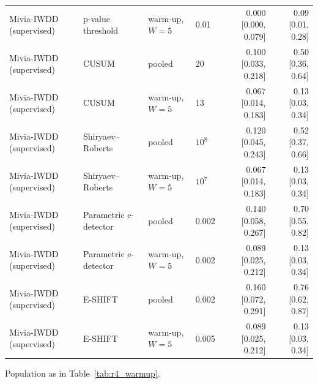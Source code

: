 \begin{table}[t]
{\begin{tabular}{llllrr}
Mivia-IWDD (supervised) & p-value threshold & warm-up, $W=5$ & 0.01 & 0.000 [0.000, 0.079] & 0.09 [0.01, 0.28] \\
Mivia-IWDD (supervised) & CUSUM & pooled & 20 & 0.100 [0.033, 0.218] & 0.50 [0.36, 0.64] \\
Mivia-IWDD (supervised) & CUSUM & warm-up, $W=5$ & 13 & 0.067 [0.014, 0.183] & 0.13 [0.03, 0.34] \\
Mivia-IWDD (supervised) & Shiryaev--Roberts & pooled & $10^{8}$ & 0.120 [0.045, 0.243] & 0.52 [0.37, 0.66] \\
Mivia-IWDD (supervised) & Shiryaev--Roberts & warm-up, $W=5$ & $10^{7}$ & 0.067 [0.014, 0.183] & 0.13 [0.03, 0.34] \\
Mivia-IWDD (supervised) & Parametric e-detector & pooled & 0.002 & 0.140 [0.058, 0.267] & 0.70 [0.55, 0.82] \\
Mivia-IWDD (supervised) & Parametric e-detector & warm-up, $W=5$ & 0.002 & 0.089 [0.025, 0.212] & 0.13 [0.03, 0.34] \\
Mivia-IWDD (supervised) & E-SHIFT & pooled & 0.002 & 0.160 [0.072, 0.291] & 0.76 [0.62, 0.87] \\
Mivia-IWDD (supervised) & E-SHIFT & warm-up, $W=5$ & 0.005 & 0.089 [0.025, 0.212] & 0.13 [0.03, 0.34] \\
\bottomrule
\end{tabular}}
\begin{minipage}{\linewidth}\vspace{2pt}\footnotesize Population as in Table~\ref{tab:r4_warmup}.\end{minipage}
\end{table}
